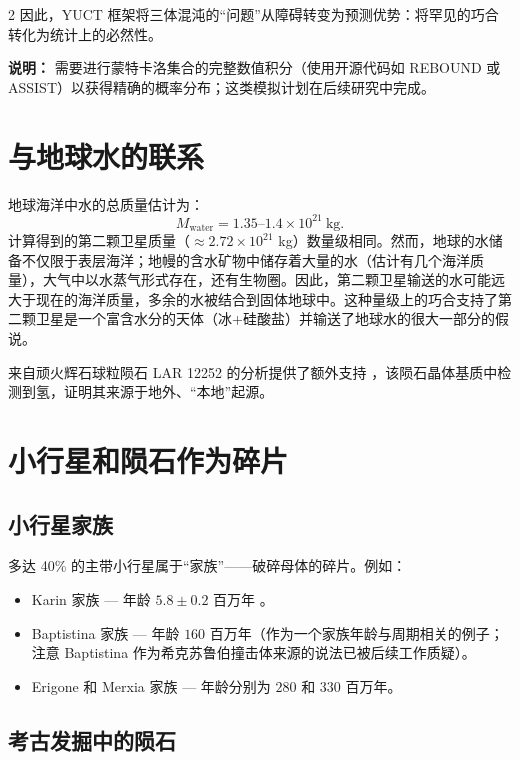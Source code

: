 \documentclass[11pt,a4paper]{article}
\begin{document}
\begin{multicols}{2}
		因此，YUCT 框架将三体混沌的“问题”从障碍转变为预测优势：将罕见的巧合转化为统计上的必然性。
		
		\vspace{0.2cm}
		\noindent
		\textbf{说明：} 需要进行蒙特卡洛集合的完整数值积分（使用开源代码如 REBOUND 或 ASSIST）以获得精确的概率分布；这类模拟计划在后续研究中完成。
		
		
		\section{与地球水的联系}
		
		地球海洋中水的总质量估计为：
		\[
		M_{\text{water}} = 1.35\text{–}1.4 \times 10^{21}\ \text{kg}.
		\]
		计算得到的第二颗卫星质量（\(\approx 2.72 \times 10^{21}\) kg）数量级相同。然而，地球的水储备不仅限于表层海洋；地幔的含水矿物中储存着大量的水（估计有几个海洋质量），大气中以水蒸气形式存在，还有生物圈。因此，第二颗卫星输送的水可能远大于现在的海洋质量，多余的水被结合到固体地球中。这种量级上的巧合支持了第二颗卫星是一个富含水分的天体（冰+硅酸盐）并输送了地球水的很大一部分的假说。
		
		来自顽火辉石球粒陨石 LAR 12252 的分析提供了额外支持 \cite{Gardiner2025}，该陨石晶体基质中检测到氢，证明其来源于地外、“本地”起源。
		
		\section{小行星和陨石作为碎片}
		
		\subsection{小行星家族}
		
		多达 40\% 的主带小行星属于“家族”——破碎母体的碎片。例如：
		\begin{itemize}
			\item Karin 家族 — 年龄 \(5.8 \pm 0.2\) 百万年 \cite{Nesvorny2002}。
			\item Baptistina 家族 — 年龄 \(160\) 百万年（作为一个家族年龄与周期相关的例子；注意 Baptistina 作为希克苏鲁伯撞击体来源的说法已被后续工作质疑）。
			\item Erigone 和 Merxia 家族 — 年龄分别为 \(280\) 和 \(330\) 百万年。
		\end{itemize}
		
		\subsection{考古发掘中的陨石}
		

\end{multicols}
\end{document}
